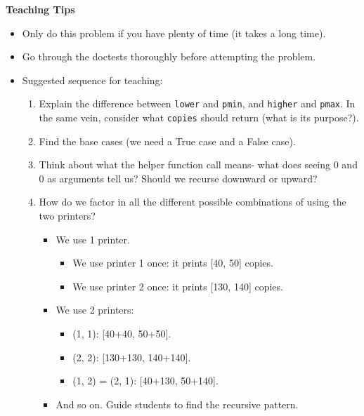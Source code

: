 \begin{blocksection}
\begin{guide}
\textbf{Teaching Tips}
\begin{itemize}
    \item Only do this problem if you have plenty of time (it takes a long time).
    \item Go through the doctests thoroughly before attempting the problem.
    \item Suggested sequence for teaching:
    \begin{enumerate}
        \item Explain the difference between \lstinline{lower} and \lstinline{pmin}, and \lstinline{higher} and \lstinline{pmax}. In the same vein, consider what \lstinline{copies} should return (what is its purpose?).
        \item Find the base cases (we need a True case and a False case).
        \item Think about what the helper function call means- what does seeing 0 and 0 as arguments tell us? Should we recurse downward or upward?
        \item How do we factor in all the different possible combinations of using the two printers?
        \begin{itemize}
            \item We use 1 printer.
            \begin{itemize}
                \item We use printer 1 once: it prints [40, 50] copies.
                \item We use printer 2 once: it prints [130, 140] copies.
            \end{itemize}
            \item We use 2 printers:
            \begin{itemize}
                \item (1, 1): [40+40, 50+50].
                \item (2, 2): [130+130, 140+140].
                \item (1, 2) = (2, 1): [40+130, 50+140].
            \end{itemize}
            \item And so on. Guide students to find the recursive pattern.

        \end{itemize}
    \end{enumerate}
\end{itemize}
\end{guide}
\end{blocksection}

